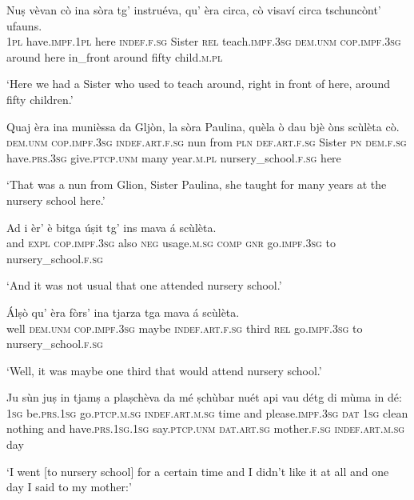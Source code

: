 \begin{linenumbers}
\gll Nuṣ vèvan cò ina sòra tg' instruéva, qu' èra circa, cò visaví circa tschuncònt’ ufauns. \\
\textsc{1pl} have.\textsc{impf.1pl} here \textsc{indef.f.sg} Sister \textsc{rel} teach.\textsc{impf.3sg} \textsc{dem.unm} \textsc{cop.impf.3sg} around here in\_front around fifty child.\textsc{m.pl}\\
\end{linenumbers}
\medskip
\glt `Here we had a Sister who used to teach around, right in front of here, around fifty children.'
\medskip

\begin{linenumbers}
\gll Quaj èra ina munièssa da Gljòn, la sòra Paulina, quèla ò dau bjè òns scùlèta cò.\\
\textsc{dem.unm} \textsc{cop.impf.3sg} \textsc{indef.art.f.sg} nun from \textsc{pln} \textsc{def.art.f.sg} Sister \textsc{pn} \textsc{dem.f.sg}  have.\textsc{prs.3sg} give.\textsc{ptcp.unm} many year.\textsc{m.pl} nursery\_school.\textsc{f.sg} here\\
\end{linenumbers}
\medskip
\glt `That was a nun from Glion, Sister Paulina, she taught for many years at the nursery school here.'
\medskip

\begin{linenumbers}
\gll Ad i èr’ è bitga úṣit tg’ ins mava á scùlèta.\\
and  \textsc{expl} \textsc{cop.impf.3sg} also \textsc{neg} usage.\textsc{m.sg}  \textsc{comp} \textsc{gnr} go.\textsc{impf.3sg} to nursery\_school.\textsc{f.sg}\\
\end{linenumbers}
\medskip
\glt `And it was not usual that one attended nursery school.'
\medskip

\begin{linenumbers}
\gll  Álṣò qu’ èra fòrs’ ina tjarza tga mava á scùlèta.  \\
well \textsc{dem.unm} \textsc{cop.impf.3sg} maybe \textsc{indef.art.f.sg} third \textsc{rel} go.\textsc{impf.3sg} to nursery\_school.\textsc{f.sg}\\
\end{linenumbers}
\medskip
\glt `Well, it was maybe one third that would attend nursery school.'
\medskip

\begin{linenumbers}
\gll  Ju sùn juṣ in tjamṣ a plaṣchèva da mé ṣchùbar nuét api vau détg di mùma in dé: \\
 \textsc{1sg} be.\textsc{prs.1sg} go.\textsc{ptcp.m.sg} \textsc{indef.art.m.sg} time and please.\textsc{impf.3sg} \textsc{dat} \textsc{1sg} clean nothing and have.\textsc{prs.1sg.1sg} say.\textsc{ptcp.unm} \textsc{dat.art.sg} mother.\textsc{f.sg} \textsc{indef.art.m.sg} day\\
\end{linenumbers}
\medskip
\glt `I went [to nursery school] for a certain time and I didn’t like it at all and one day I said to my mother:'
\medskip

